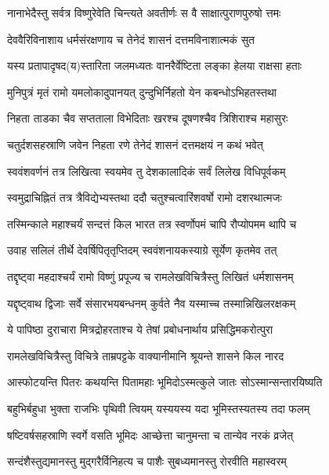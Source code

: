 \twolineshloka
{नानाभेदैस्तु सर्वत्र विष्णुरेवेति चिन्त्यते}
{अवतीर्णः स वै साक्षात्पुराणपुरुषो त्तमः}%

\twolineshloka
{देववैरिविनाशाय धर्मसंरक्षणाय च}
{तेनेदं शासनं दत्तमविनाशात्मकं सुत}%

\twolineshloka
{यस्य प्रतापादृषद(य)स्तारिता जलमध्यतः}
{वानरैर्वेष्टिता लङ्का हेलया राक्षसा हताः}%

\twolineshloka
{मुनिपुत्रं मृतं रामो यमलोकादुपानयत्}
{दुन्दुभिर्निहतो येन कबन्धोऽभिहतस्तथा}%

\twolineshloka
{निहता ताडका चैव सप्तताला विभेदिताः}
{खरश्च दूषणश्चैव त्रिशिराश्च महासुरः}%

\twolineshloka
{चतुर्दशसहस्राणि जवेन निहता रणे}
{तेनेदं शासनं दत्तमक्षयं न कथं भवेत्}%

\twolineshloka
{स्ववंशवर्णनं तत्र लिखित्वा स्वयमेव तु}
{देशकालादिकं सर्वं लिलेख विधिपूर्वकम्}%

\twolineshloka
{स्वमुद्राचिह्नितं तत्र त्रैविद्येभ्यस्तथा ददौ}
{चतुश्चत्वारिंशवर्षो रामो दशरथात्मजः}%

\twolineshloka
{तस्मिन्काले महाश्चर्यं सन्दत्तं किल भारत}
{तत्र स्वर्णोपमं चापि रौप्योपमम थापि च}%

\twolineshloka
{उवाह सलिलं तीर्थे देवर्षिपितृतृप्तिदम्}
{स्ववंशनायकस्याग्रे सूर्येण कृतमेव तत्}%

\twolineshloka
{तद्दृष्ट्वा महदाश्चर्यं रामो विष्णुं प्रपूज्य च}
{रामलेखविचित्रैस्तु लिखितं धर्मशासनम्}%

\twolineshloka
{यद्दृष्ट्वाथ द्विजाः सर्वे संसारभयबन्धनम्}
{कुर्वते नैव यस्माच्च तस्मान्निखिलरक्षकम्}%

\twolineshloka
{ये पापिष्ठा दुराचारा मित्रद्रोहरताश्च ये}
{तेषां प्रबोधनार्थाय प्रसिद्धिमकरोत्पुरा}%

\twolineshloka
{रामलेखविचित्रैस्तु विचित्रे ताम्रपट्टके}
{वाक्यानीमानि श्रूयन्ते शासने किल नारद}%

\twolineshloka
{आस्फोटयन्ति पितरः कथयन्ति पितामहाः}
{भूमिदोऽस्मत्कुले जातः सोऽस्मान्सन्तारयिष्यति}%

\twolineshloka
{बहुभिर्बहुधा भुक्ता राजभिः पृथिवी त्वियम्}
{यस्ययस्य यदा भूमिस्तस्यतस्य तदा फलम्}%

\twolineshloka
{षष्टिवर्षसहस्राणि स्वर्गे वसति भूमिदः}
{आच्छेत्ता चानुमन्ता च तान्येव नरकं व्रजेत्}%

\twolineshloka
{सन्दंशैस्तुद्यमानस्तु मुद्गरैर्विनिहत्य च}
{पाशैः सुबध्यमानस्तु रोरवीति महास्वरम्}%

